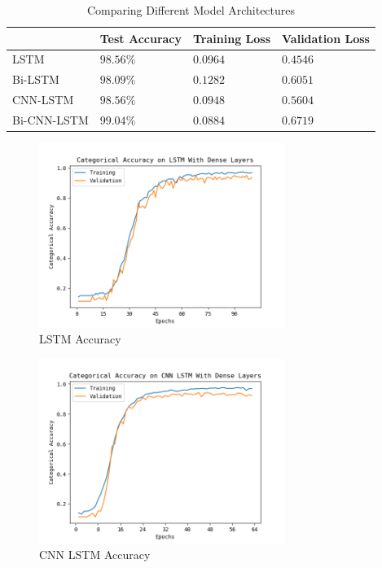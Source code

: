 \documentclass[journal]{IEEEtran}
\begin{document}
    \begin{table}[h!]
      \begin{center}
        \caption{Comparing Different Model Architectures}
        \label{tab:model_results}
        \begin{tabular}{l|l|l|l} %
          & \textbf{Test Accuracy} & \textbf{Training Loss} & \textbf{Validation Loss}\\
          \hline
          LSTM        & $98.56\%$ & $0.0964$ & $0.4546$ \\
          Bi-LSTM     & $98.09\%$ & $0.1282$ & $0.6051$ \\
          CNN-LSTM    & $98.56\%$ & $0.0948$ & $0.5604$ \\
          Bi-CNN-LSTM & $99.04\%$ & $0.0884$ & $0.6719$ \\
        \end{tabular}
      \end{center}
    \end{table}
  
    \begin{figure}[h]
      \centering
      \includegraphics[width=8cm]{figures/01-58-36Forward_LSTM With Dense Layers_accuracy.png}
      \caption{LSTM Accuracy}
      \label{fig:lstm_accuracy}
    \end{figure}

    \begin{figure}[h]
      \centering
      \includegraphics[width=8cm]{figures/02-07-24Forward_CNN LSTM With Dense Layers_accuracy.png}
      \caption{CNN LSTM Accuracy}
      \label{fig:cnn_accuracy}
    \end{figure}
\end{document}
